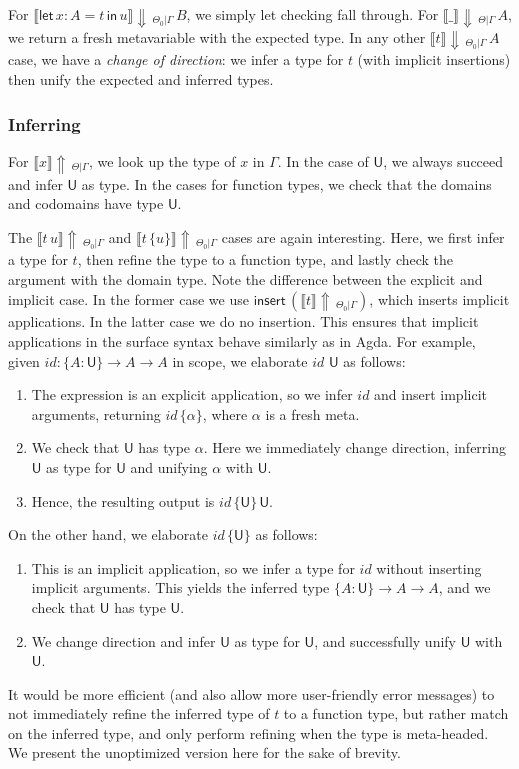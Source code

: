 \documentclass[acmsmall,review,anonymous,prologue,dvipsnames]{acmart}\settopmatter{printfolios=true,printccs=false,printacmref=false}
\newcommand{\slet}{\boldsymbol{\mathsf{let}}}
\renewcommand{\sin}{\boldsymbol{\mathsf{in}}}
\renewcommand{\U}{\mathsf{U}}
\newcommand{\mi}[1]{\mathit{#1}}
\newcommand{\echeck}[4]{\llbracket#1\rrbracket\!\Downarrow\,_{#2|#3}\,#4}
\newcommand{\einfer}[3]{\llbracket#1\rrbracket\!\Uparrow\,_{#2|#3}}
\newcommand{\einsert}{\mathsf{insert}}
\theoremstyle{remark}
\begin{document}
For $\echeck{\slet\,x:A=t\,\sin\,u}{\Theta_0}{\Gamma}{B}$, we simply let
checking fall through. For $\echeck{\_}{\Theta}{\Gamma}{A}$, we return a fresh
metavariable with the expected type. In any other
$\echeck{t}{\Theta_0}{\Gamma}{A}$ case, we have a \emph{change of direction}: we
infer a type for $t$ (with implicit insertions) then unify the expected and
inferred types.

\subsubsection{Inferring}

For $\einfer{x}{\Theta}{\Gamma}$, we look up the type of $x$ in $\Gamma$. In the
case of $\U$, we always succeed and infer $\U$ as type. In the cases for
function types, we check that the domains and codomains have type $\U$.

The $\einfer{t\,u}{\Theta_0}{\Gamma}$ and $\einfer{t\,\{u\}}{\Theta_0}{\Gamma}$
cases are again interesting. Here, we first infer a type for $t$, then refine
the type to a function type, and lastly check the argument with the domain
type. Note the difference between the explicit and implicit case. In the former
case we use $\einsert\,(\einfer{t}{\Theta_0}{\Gamma})$, which inserts implicit
applications. In the latter case we do no insertion. This ensures that implicit
applications in the surface syntax behave similarly as in Agda. For example,
given $\mi{id} : \{A : \U\}\to A\to A$ in scope, we elaborate $\mi{id}\,\,\U$ as follows:
\begin{enumerate}
  \item The expression is an explicit application, so we infer $\mi{id}$ and insert implicit
        arguments, returning $\mi{id}\,\{\alpha\}$, where $\alpha$ is a fresh meta.
  \item We check that $\U$ has type $\alpha$. Here we immediately change direction,
        inferring $\U$ as type for $\U$ and unifying $\alpha$ with $\U$.
  \item Hence, the resulting output is $\mi{id}\,\{\U\}\,\U$.
\end{enumerate}
On the other hand, we elaborate $\mi{id}\,\{\U\}$ as follows:
\begin{enumerate}
  \item This is an implicit application, so we infer a type for $\mi{id}$ without inserting
    implicit arguments. This yields the inferred type $\{A : \U\}\to A\to A$, and
    we check that $\U$ has type $\U$.
  \item We change direction and infer $\U$ as type for $\U$, and successfully
    unify $\U$ with $\U$.
\end{enumerate}
It would be more efficient (and also allow more user-friendly error
messages) to not immediately refine the inferred type of $t$ to a function type,
but rather match on the inferred type, and only perform refining when the type
is meta-headed. We present the unoptimized version here for the sake of brevity.
\end{document}
